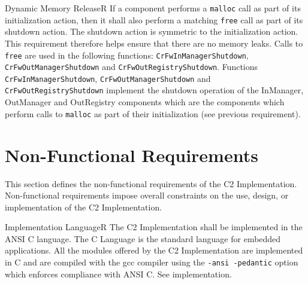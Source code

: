 \documentclass{pnp_article}
\begin{document}
\begin{fwReq}{Dynamic Memory Release}{R}
{If a component performs a \texttt{malloc} call as part of its initialization action, then it shall also perform a matching \texttt{free} call as part of its shutdown action.}
{The shutdown action is symmetric to the initialization action. This requirement therefore helps ensure that there are no memory leaks.}
{Calls to \texttt{free} are used in the following functions: \texttt{CrFwInManagerShutdown}, \texttt{CrFwOutManagerShutdown} and \texttt{CrFwOutRegistryShutdown}.   } 
{Functions \texttt{CrFwInManagerShutdown}, \texttt{CrFwOutManagerShutdown} and \texttt{CrFwOutRegistryShutdown} implement the shutdown operation of the InManager, OutManager and OutRegistry components which are the components which perform calls to \texttt{malloc} as part of their initialization (see previous requirement).}
\end{fwReq}









\section{Non-Functional Requirements}

This section defines the non-functional requirements of the C2 Implementation. Non-functional requirements impose overall constraints on the use, 
design, or implementation of the C2 Implementation.

\label{req:codingReqs}

\begin{fwReq}{Implementation Language}{R}
{The C2 Implementation shall be implemented in the ANSI C language.}
{The C Language is the standard language for embedded applications.}
{All the modules offered by the C2 Implementation are implemented in C and are compiled with the gcc compiler using the \texttt{-ansi -pedantic} option which enforces compliance with ANSI C.} 
{See implementation.}
\end{fwReq}
\end{document}
